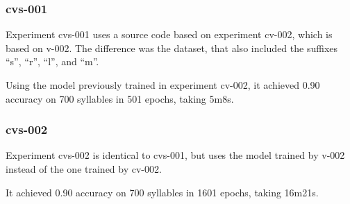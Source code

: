 \subsubsection{cvs-001}

Experiment cvs-001 uses a source code based on experiment cv-002, which is based on v-002. The difference was the dataset, that also included the suffixes ``s'', ``r'', ``l'', and ``m''.

Using the model previously trained in experiment cv-002, it achieved 0.90 accuracy on 700 syllables in 501 epochs, taking 5m8s.

\subsubsection{cvs-002}
Experiment cvs-002 is identical to cvs-001, but uses the model trained by v-002 instead of the one trained by cv-002.

It achieved 0.90 accuracy on 700 syllables in 1601 epochs, taking 16m21s.
